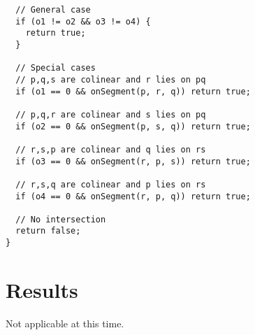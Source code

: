 \documentclass{article}
\begin{document}
\begin{lstlisting}
  // General case
  if (o1 != o2 && o3 != o4) {
    return true;
  }

  // Special cases
  // p,q,s are colinear and r lies on pq
  if (o1 == 0 && onSegment(p, r, q)) return true;

  // p,q,r are colinear and s lies on pq
  if (o2 == 0 && onSegment(p, s, q)) return true;

  // r,s,p are colinear and q lies on rs
  if (o3 == 0 && onSegment(r, p, s)) return true;

  // r,s,q are colinear and p lies on rs
  if (o4 == 0 && onSegment(r, p, q)) return true;

  // No intersection
  return false;
}
\end{lstlisting}

\section{Results}
Not applicable at this time.
\end{document}
